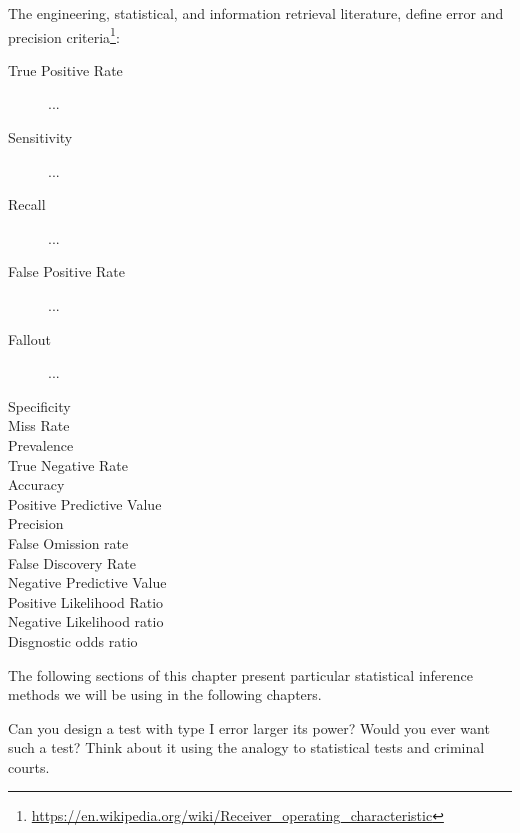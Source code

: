 \begin{extra}

The engineering, statistical, and information retrieval literature, define error and precision criteria\footnote{\url{https://en.wikipedia.org/wiki/Receiver_operating_characteristic}}:
\begin{description}
	\item[True Positive Rate] ...
	\item[Sensitivity] ...
	\item[Recall] ...
	\item[False Positive Rate] ...
	\item[Fallout] ...
	\item[Specificity]
	\item[Miss Rate]
	\item[Prevalence]
	\item[True Negative Rate]
	\item[Accuracy]
	\item[Positive Predictive Value]
	\item[Precision] 
	\item[False Omission rate]
	\item[False Discovery Rate]
	\item[Negative Predictive Value]
	\item[Positive Likelihood Ratio]
	\item[Negative Likelihood ratio]
	\item[Disgnostic odds ratio]
\end{description}
\end{extra}


The following sections of this chapter present particular statistical inference methods we will be using in the following chapters.


\begin{think}
Can you design a test with type I error larger its power?
Would you ever want such a test?
Think about it using the analogy to statistical tests and criminal courts. 
\end{think}



